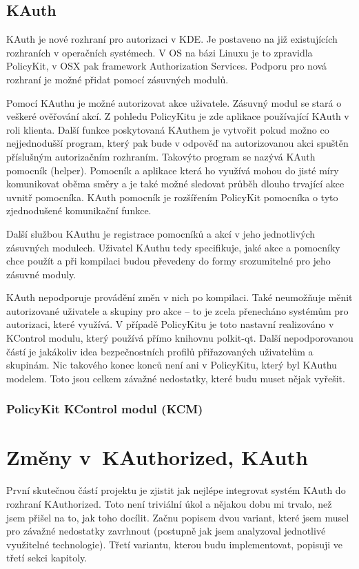 
\section{KAuth}
KAuth je nové rozhraní pro autorizaci v KDE. Je postaveno na již existujících 
rozhraních v operačních systémech. V OS na bázi Linuxu je to zpravidla
PolicyKit, v OSX pak framework Authorization Services. Podporu pro nová rozhraní
je možné přidat pomocí zásuvných modulů.

Pomocí KAuthu je možné autorizovat akce uživatele. Zásuvný modul se stará
o veškeré ověřování akcí. Z pohledu PolicyKitu je zde aplikace používající
KAuth v roli klienta.
Další funkce poskytovaná KAuthem je vytvořit pokud možno co nejjednodušší
program, který pak bude v odpověď na autorizovanou akci spuštěn příslušným
autorizačním rozhraním. Takovýto program se nazývá KAuth pomocník (helper).
Pomocník a aplikace která ho využívá mohou do jisté míry komunikovat oběma směry
a je také možné sledovat průběh dlouho trvající akce uvnitř pomocníka. KAuth
pomocník je rozšířením PolicyKit pomocníka o tyto zjednodušené komunikační
funkce.

Další službou KAuthu je registrace pomocníků a akcí v jeho jednotlivých
zásuvných modulech. Uživatel KAuthu tedy specifikuje, jaké akce a pomocníky chce
použít a při kompilaci budou převedeny do formy srozumitelné pro jeho zásuvné
moduly.

KAuth nepodporuje provádění změn v nich po kompilaci. Také neumožňuje měnit
autorizované uživatele a skupiny pro akce -- to je zcela přenecháno systémům pro
autorizaci, které využívá. V případě PolicyKitu je toto nastavní realizováno
v KControl modulu, který používá přímo knihovnu polkit-qt. Další nepodporovanou
částí je jakákoliv idea bezpečnostních profilů přiřazovaných uživatelům
a skupinám. Nic takového konec konců není ani v PolicyKitu, který byl KAuthu
modelem. Toto jsou celkem závažné nedostatky, které budu muset nějak vyřešit.

\subsection{PolicyKit KControl modul (KCM)}
\chapter{Změny v~KAuthorized, KAuth}
První skutečnou částí projektu je zjistit jak nejlépe integrovat systém KAuth do
rozhraní KAuthorized. Toto není triviální úkol a nějakou dobu mi trvalo, než
jsem přišel na to, jak toho docílit. Začnu popisem dvou variant, které jsem
musel pro závažné nedostatky zavrhnout (postupně jak jsem analyzoval jednotlivé 
využitelné technologie). Třetí variantu, kterou budu implementovat, popisuji
ve třetí sekci kapitoly.
